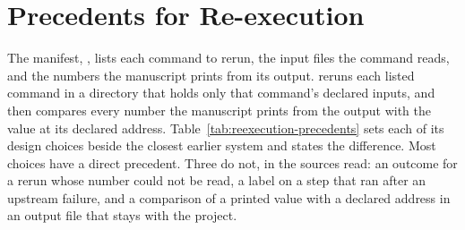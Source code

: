 \section{Precedents for Re-execution}
\label{sec:reexecution-precedents}

The  manifest, , lists each command to rerun, the input files the
command reads, and the numbers the manuscript prints from its output. 
reruns each listed command in a directory that holds only that command's declared inputs, and
then compares every number the manuscript prints from the output with the value at its declared
address. Table~\ref{tab:reexecution-precedents} sets each
of its design choices beside the closest earlier system and states the difference. Most choices
have a direct precedent. Three do not, in the sources read: an outcome for a rerun whose number
could not be read, a label on a step that ran after an upstream failure, and a comparison of a
printed value with a declared address in an output file that stays with the project.

